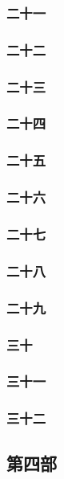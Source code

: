 \subsubsection*{二十一}
\subsubsection*{二十二}
\subsubsection*{二十三}
\subsubsection*{二十四}
\subsubsection*{二十五}
\subsubsection*{二十六}
\subsubsection*{二十七}
\subsubsection*{二十八}
\subsubsection*{二十九}
\subsubsection*{三十}
\subsubsection*{三十一}
\subsubsection*{三十二}







\subsection*{第四部}



